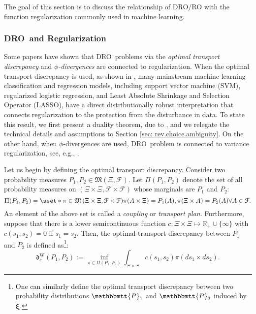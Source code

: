 \documentclass[final,onefignum,onetabnum]{class}
\DeclareMathOperator*{\esssup}{ess\,sup}
\newcommand{\bs}[1]{\boldsymbol{#1}} %
\newcommand{\Bs}[1]{\mathbb{#1}} %
\newcommand{\Ts}[1]{\mathbbmtt{#1}} %
\newcommand{\Cs}[1]{\mathcal{#1}} %
\newcommand{\Fs}[1]{\mathfrak{#1}} %
\newcommand{\txi}{\tilde{\bs{\xi}}}
\newcommand{\measurespace}{\left( \Xi, \Cs{F} \right)}
\newcommand{\promeasurespace}{\left( \Xi \times \Xi, \Cs{F} \times \Cs{F} \right)}
\newcommand{\dro}{DRO}
\begin{document}
The goal of this section is to discuss the relationship of \dro/RO with the function regularization commonly used in machine learning. 

\subsubsection{\dro\ and Regularization}
Some papers have shown that \dro\ problems  via the {\it optimal transport discrepancy} and {\it $\phi$-divergences} are connected to regularization. When the optimal transport discrepancy is used,  as shown in \citet{shafieezadeh2015,blanchet2016robust,gao2016},  many  mainstream machine learning classification and regression models, including support vector machine (SVM), regularized logistic regression, and Least Absolute Shrinkage and Selection Operator (LASSO), have a direct distributionally robust interpretation that connects regularization to the protection from the disturbance in data. 
To state this result, we  first present a   duality theorem, due to \citet{blanchet2017DRO}, and we relegate  the technical details and assumptions to Section \ref{sec: rev.choice.ambiguity}. %
On the other hand, when $\phi$-divergences are used, \dro\ problem is connected to variance regularization, see, e.g.,  \citet{duchi2016,namkoong2018variance}. 

Let us begin by defining the optimal transport discrepancy. Consider two probability measures $P_{1},  P_{2} \in \Fs{M}\measurespace$. Let $\Pi(P_{1},  P_{2})$ denote the set of all  probability measures on $\promeasurespace$ whose marginals are $P_{1}$ and $P_{2}$: 
\begin{equation*}
    \Pi(P_{1},  P_{2})=\sset*{ \pi \in\Fs{M}\promeasurespace}{\pi(A\times\Xi) = P_{1}(A), \pi(\Xi\times A) = P_{2}(A)   \forall A\in\Cs{F} }. 
\end{equation*}
An element of the above set is called a {\it coupling} or {\it transport plan}. 
Furthermore, suppose that  there is a lower semicontinuous function $c: \Xi \times \Xi \mapsto \Bs{R}_{+} \cup\{\infty\}$ with $c(s_{1},s_{2})=0$ if $s_{1}=s_{2}$.  
Then, the optimal transport discrepancy between  $P_{1}$ and $P_{2}$ is defined as\footnote{One can similarly define the optimal transport discrepancy between  two probability distributions $\Ts{P}_{1}$ and $\Ts{P}_{2}$ induced by $\txi$.}:
\begin{equation*} 
\Fs{d}^{\text{W}}_{c}(P_{1},  P_{2}):= %
\inf_{\pi\in \Pi(P_{1},  P_{2})}  \int_{\Xi\times \Xi} c(s_1,s_2) \pi(d s_1\times d s_2). %
\end{equation*}
\end{document}
